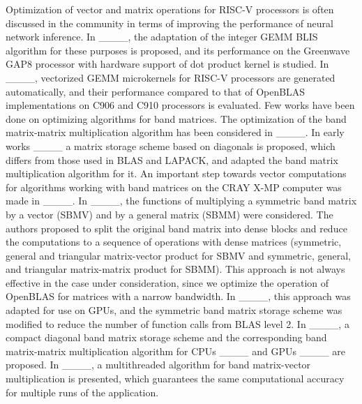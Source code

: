 Optimization of vector and matrix operations for RISC-V processors is often discussed in the community in terms of improving the performance of neural network inference. In ____, the adaptation of the integer GEMM BLIS algorithm for these purposes is proposed, and its performance on the Greenwave GAP8 processor with hardware support of dot product kernel is studied. In ____, vectorized GEMM microkernels for RISC-V processors are generated automatically, and their performance compared to that of OpenBLAS implementations on C906 and C910 processors is evaluated. Few works have been done on optimizing algorithms for band matrices. The optimization of the band matrix-matrix multiplication algorithm has been considered in ____. In early works ____ a matrix storage scheme based on diagonals is proposed, which differs from those used in BLAS and LAPACK, and adapted the band matrix multiplication algorithm for it. An important step towards vector computations for algorithms working with band matrices on the CRAY X-MP computer was made in ____. In ____, the functions of multiplying a symmetric band matrix by a vector (SBMV) and by a general matrix (SBMM) were considered. The authors proposed to split the original band matrix into dense blocks and reduce the computations to a sequence of operations with dense matrices (symmetric, general and triangular matrix-vector product for SBMV and symmetric, general, and triangular matrix-matrix product for SBMM). This approach is not always effective in the case under consideration, since we optimize the operation of OpenBLAS for matrices with a narrow bandwidth. In ____, this approach was adapted for use on GPUs, and the symmetric band matrix storage scheme was modified to reduce the number of function calls from BLAS level 2. In ____, a compact diagonal band matrix storage scheme and the corresponding band matrix-matrix multiplication algorithm for CPUs ____ and GPUs ____ are proposed. In ____, a multithreaded algorithm for band matrix-vector multiplication is presented, which guarantees the same computational accuracy for multiple runs of the application.

